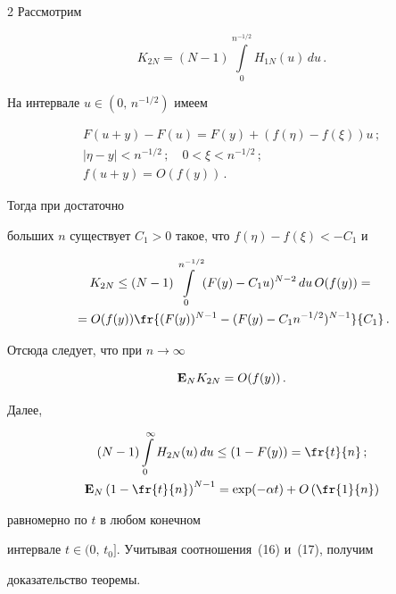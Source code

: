 \begin{multicols}{2}
Рассмотрим 


$$


K_{2N}=(N-1)\int\limits_{0}^{n^{-1/2}}H_{1N}(u)\,du\,.


$$ 


На интервале $u\in(0,\,n^{-1/2})$ имеем


\begin{gather*}


F(u+y)-F(u)=F(y)+(f(\eta)-f(\xi))u\,; \\ 


|\eta-y|<n^{-1/2}\,; \quad


 0<\xi<n^{-1/2}\,; \\ 


f(u+y)=O(f(y))\,.


\end{gather*} 


Тогда при достаточно


больших $n$ существует $C_1>0$ такое, что $f(\eta)-f(\xi)<-C_1$ и


\begin{multline*}


K_{2N}\leq (N-1)\int\limits_{0}^{n^{-1/2}}(F(y)-C_1u)^{N-2}\,du \,


O(f(y))={}\\


{}=O(f(y))\fr{(F(y))^{N-1}-(F(y)-C_1n^{-1/2})^{N-1}}{C_1}\,.


\end{multline*}


Отсюда следует, что при $n \to \infty$ 


$$


{\bf E}_NK_{2N}=O(f(y))\,.


$$ 


Далее,


\begin{gather*}


(N-1)\int\limits_{0}^{\infty}H_{2N}(u)\,du\leq(1-F(y))=\fr{t}{n}\,;\\


{\bf E}_N\left(1-\fr{t}{n}\right)^{N-1}=\exp(-\alpha


t)+O\left(\fr{1}{n}\right)


\end{gather*}


равномерно по $t$ в любом конечном


интервале $t\in(0,\,t_0].$ Учитывая соотношения~(16) и~(17), получим


доказательство теоремы.






\end{multicols}
